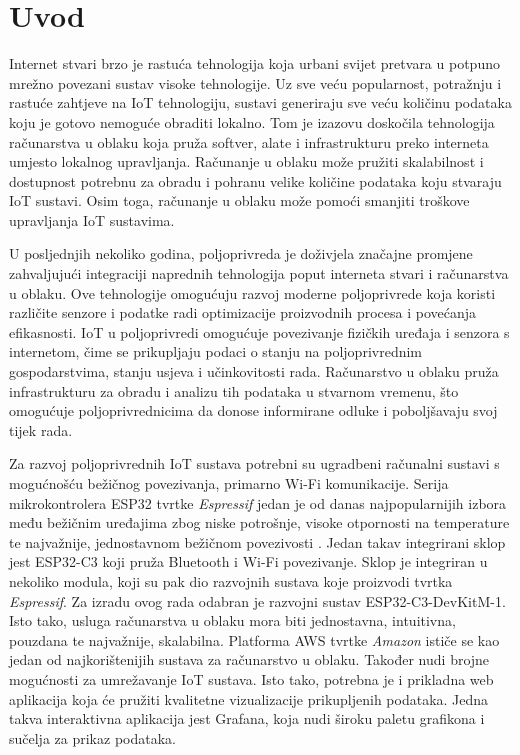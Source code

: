 \chapter{Uvod}

Internet stvari  brzo je rastuća tehnologija koja urbani svijet pretvara u potpuno mrežno povezani sustav visoke tehnologije. Uz sve veću popularnost, potražnju i rastuće zahtjeve na IoT tehnologiju, sustavi generiraju sve veću količinu podataka koju je gotovo nemoguće obraditi lokalno. Tom je izazovu doskočila tehnologija računarstva u oblaku  koja pruža softver, alate i infrastrukturu preko interneta umjesto lokalnog upravljanja. Računanje u oblaku može pružiti skalabilnost i dostupnost potrebnu za obradu i pohranu velike količine podataka koju stvaraju IoT sustavi. Osim toga, računanje u oblaku može pomoći smanjiti troškove upravljanja IoT sustavima. 

U posljednjih nekoliko godina, poljoprivreda je doživjela značajne promjene zahvaljujući integraciji naprednih tehnologija poput interneta stvari i računarstva u oblaku. Ove tehnologije omogućuju razvoj moderne poljoprivrede koja koristi različite senzore i podatke radi optimizacije proizvodnih procesa i povećanja efikasnosti. IoT u poljoprivredi omogućuje povezivanje fizičkih uređaja i senzora s internetom, čime se prikupljaju podaci o stanju na poljoprivrednim gospodarstvima, stanju usjeva i učinkovitosti rada. Računarstvo u oblaku pruža infrastrukturu za obradu i analizu tih podataka u stvarnom vremenu, što omogućuje poljoprivrednicima da donose informirane odluke i poboljšavaju svoj tijek rada. 

Za razvoj poljoprivrednih IoT sustava potrebni su ugradbeni računalni sustavi s mogućnošću bežičnog povezivanja, primarno Wi-Fi komunikacije. Serija mikrokontrolera ESP32 tvrtke \textit{Espressif} jedan je od danas najpopularnijih izbora među bežičnim uređajima zbog niske potrošnje, visoke otpornosti na temperature te najvažnije, jednostavnom bežičnom povezivosti \cite{top_iot_boards}. Jedan takav integrirani sklop jest ESP32-C3 koji pruža Bluetooth i Wi-Fi povezivanje. Sklop je integriran u nekoliko modula, koji su pak dio razvojnih sustava koje proizvodi tvrtka \textit{Espressif}. Za izradu ovog rada odabran je razvojni sustav ESP32-C3-DevKitM-1. Isto tako, usluga računarstva u oblaku mora biti jednostavna, intuitivna, pouzdana te najvažnije, skalabilna. Platforma AWS tvrtke \textit{Amazon} ističe se kao jedan od najkorištenijih sustava za računarstvo u oblaku. Također nudi brojne mogućnosti za umrežavanje IoT sustava. Isto tako, potrebna je i prikladna web aplikacija koja će pružiti kvalitetne vizualizacije prikupljenih podataka. Jedna takva interaktivna aplikacija jest Grafana, koja nudi široku paletu grafikona i sučelja za prikaz podataka. 

